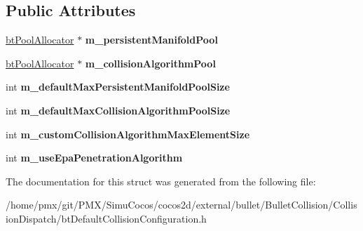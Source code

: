 \subsection*{Public Attributes}
\begin{DoxyCompactItemize}
\item 
\mbox{\label{structbtDefaultCollisionConstructionInfo_a9d1c95444327ce545b6d9ad1c99a27dd}} 
\hyperlink{classbtPoolAllocator}{bt\+Pool\+Allocator} $\ast$ {\bfseries m\+\_\+persistent\+Manifold\+Pool}
\item 
\mbox{\label{structbtDefaultCollisionConstructionInfo_aad380bba1866c223b41fc7350ae777ce}} 
\hyperlink{classbtPoolAllocator}{bt\+Pool\+Allocator} $\ast$ {\bfseries m\+\_\+collision\+Algorithm\+Pool}
\item 
\mbox{\label{structbtDefaultCollisionConstructionInfo_aa360b883562dfa18695939f8832eb5f3}} 
int {\bfseries m\+\_\+default\+Max\+Persistent\+Manifold\+Pool\+Size}
\item 
\mbox{\label{structbtDefaultCollisionConstructionInfo_aa1db1dc0bf03dffb8b0b152b6d96077e}} 
int {\bfseries m\+\_\+default\+Max\+Collision\+Algorithm\+Pool\+Size}
\item 
\mbox{\label{structbtDefaultCollisionConstructionInfo_aac52955ec7c669bf09256360f8133935}} 
int {\bfseries m\+\_\+custom\+Collision\+Algorithm\+Max\+Element\+Size}
\item 
\mbox{\label{structbtDefaultCollisionConstructionInfo_afb2823015e0637b29493c7f999bf54ff}} 
int {\bfseries m\+\_\+use\+Epa\+Penetration\+Algorithm}
\end{DoxyCompactItemize}


The documentation for this struct was generated from the following file\+:\begin{DoxyCompactItemize}
\item 
/home/pmx/git/\+P\+M\+X/\+Simu\+Cocos/cocos2d/external/bullet/\+Bullet\+Collision/\+Collision\+Dispatch/bt\+Default\+Collision\+Configuration.\+h\end{DoxyCompactItemize}

